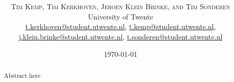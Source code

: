 \documentclass[twoside]{article}
\title{\vspace{-15mm}\fontsize{24pt}{10pt}\selectfont\textbf{\articletitle}} %
\author{
\large
\textsc{Tim Kemp, Tim Kerkhoven, Jeroen Klein Brinke, and Tim Sonderen}\\[2mm] %
\normalsize University of Twente \\ %
\normalsize \href{mailto:t.kerkhoven@student.utwente.nl}{t.kerkhoven@student.utwente.nl}, 
\href{mailto:t.kemp@student.utwente.nl}{t.kemp@student.utwente.nl},\\ \normalsize
\href{mailto:j.klein.brinke@student.utwente.nl}{j.klein.brinke@student.utwente.nl}, \href{mailto:t.sonderen@student.utwente.nl}{t.sonderen@student.utwente.nl}%
}
\date{\today}
\theoremstyle{definition}
\theoremstyle{plain}
\begin{document}
\thispagestyle{empty}
\maketitle %


\begin{abstract}

\noindent Abstract here

\end{abstract}

\end{document}
